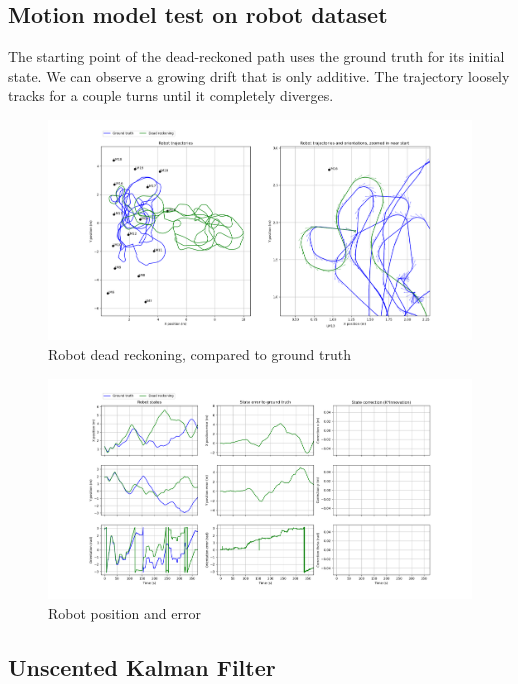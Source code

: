 \documentclass{article}
\begin{document}
\subsection{Motion model test on robot dataset}
The starting point of the dead-reckoned path uses the ground truth for its initial state. We can observe a growing drift that is only additive. The trajectory loosely tracks for a couple turns until it completely diverges.

\begin{figure}
\centering
\includegraphics[width=\textwidth]{Figure_2.png}
\caption{Robot dead reckoning, compared to ground truth}
\end{figure}

\begin{figure}
\centering
\includegraphics[width=\textwidth]{Figure_3.png}
\caption{Robot position and error}
\end{figure}

\subsection{Unscented Kalman Filter}
\end{document}
